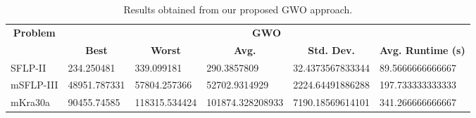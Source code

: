 \begin{table}[h!]
\begin{adjustwidth}{-1.18in}{}
\centering
\begin{tabular}{|l|l|l|l|l|l|}
	\hline
	\multicolumn{1}{|c|}{\multirow{2}{*}{\textbf{Problem}}} & \multicolumn{5}{c|}{\textbf{GWO}} \\ \cline{2-6} 
	\multicolumn{1}{|c|}{}                                  & \multicolumn{1}{c|}{\textbf{Best}} & \multicolumn{1}{c|}{\textbf{Worst}} & \multicolumn{1}{c|}{\textbf{Avg.}} & \multicolumn{1}{c|}{\textbf{Std. Dev.}} & \multicolumn{1}{c|}{\textbf{Avg. Runtime (s)}} \\ \hline
	SFLP-II                                                 & 234.250481                                  & 339.099181                                   & 290.3857809                      & 32.4373567833344                                 & 89.5666666666667                                  \\ \hline
	mSFLP-III                                               & 48951.787331                                & 57804.257366                                 & 52702.9314929						         & 2224.64491886288                              & 197.733333333333                               \\ \hline
	mKra30a                                               & 90455.74585                                & 118315.534424                                 &
	101874.328208933							&
	7190.18569614101							&
	341.266666666667						\\ \hline
\end{tabular}
\end{adjustwidth}
\caption{Results obtained from our proposed GWO approach.}
\label{approach-gwo-results}
\end{table}

